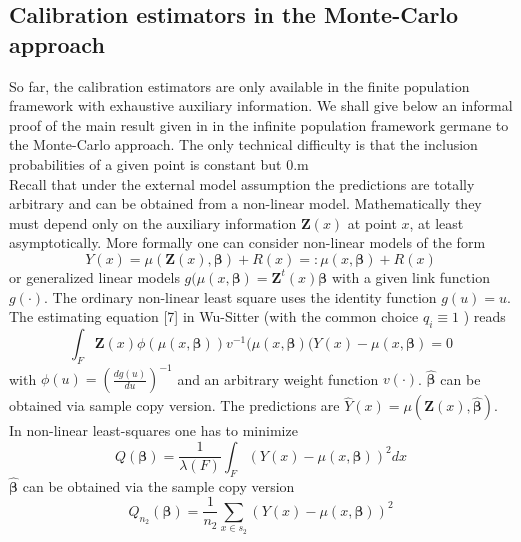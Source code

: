 \documentclass[a4paper,12pt,leqno, titlepage]{article}
\begin{document}
\begin{appendix}
  \subsection{Calibration estimators in the Monte-Carlo approach}\label{calibrationmontecarlo}
  So far, the calibration estimators are only available in the finite population framework with exhaustive auxiliary information. We shall give below an informal proof of the main result given in \cite{wusitter1} in the infinite population framework germane to the Monte-Carlo approach. The only technical difficulty is that the inclusion probabilities of a given point is constant but $0$.m\\
   Recall that under the external model assumption the predictions are totally arbitrary and can be obtained from a non-linear model. Mathematically they must depend only on the auxiliary information $\pmb{Z}(x)$ at point $x$, at least asymptotically. More formally one can consider non-linear models of the form
 $$Y(x)=\mu(\pmb{Z}(x),\pmb{\beta}) + R(x)=:\mu(x,\pmb{\beta})+R(x)$$
 or generalized linear models $g(\mu(x,\pmb{\beta})=\pmb{Z}^t(x)\pmb{\beta}$
  with a given link function $g(\cdot)$. The ordinary non-linear least square uses the identity function $g(u)=u$. The estimating equation [7] in Wu-Sitter (with the common choice $q_i \equiv 1$ ) reads
 \begin{equation}
 \int_F\pmb{Z}(x)\phi(\mu(x,\pmb{\beta}))v^{-1}(\mu(x,\pmb{\beta})(Y(x)-\mu(x,\pmb{\beta})=0
 \end{equation}
 with $\phi(u)=(\frac{dg(u)}{du})^{-1}$ and an arbitrary weight function $v(\cdot)$. $\hat{\pmb{\beta}}$ can be obtained via sample copy version. The predictions are $\hat{Y}(x)=\mu(\pmb{Z}(x),\hat{\pmb{\beta}})$.\\
 In non-linear least-squares one has to minimize
 \begin{equation}
 Q(\pmb{\beta})=\frac{1}{\lambda(F)}\int_F (Y(x)-\mu(x,\pmb{\beta}))^2dx
 \end{equation}
  $\hat{\pmb{\beta}}$ can be obtained via the sample copy version
  \begin{equation}
  Q_{n_2}(\pmb{\beta})=\frac{1}{n_2}\sum_{x\in{s_2}} (Y(x)-\mu(x,\pmb{\beta}))^2
  \end{equation}

\end{appendix}
\end{document}
